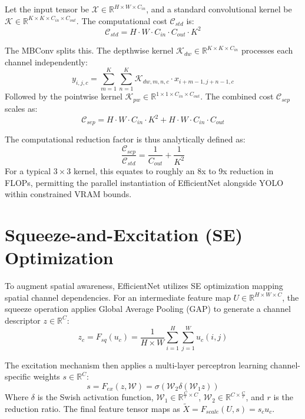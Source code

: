 \documentclass[11pt, letterpaper, oneside, openany]{book}
\begin{document}
Let the input tensor be $\mathcal{X} \in \mathbb{R}^{H \times W \times C_{in}}$, and a standard convolutional kernel be $\mathcal{K} \in \mathbb{R}^{K \times K \times C_{in} \times C_{out}}$. The computational cost $\mathcal{C}_{std}$ is:
\begin{equation}
    \mathcal{C}_{std} = H \cdot W \cdot C_{in} \cdot C_{out} \cdot K^2
\end{equation}

The MBConv splits this. The depthwise kernel $\mathcal{K}_{dw} \in \mathbb{R}^{K \times K \times C_{in}}$ processes each channel independently:
\begin{equation}
    y_{i,j,c} = \sum_{m=1}^{K}\sum_{n=1}^{K} \mathcal{K}_{dw,m,n,c} \cdot x_{i+m-1, j+n-1, c}
\end{equation}
Followed by the pointwise kernel $\mathcal{K}_{pw} \in \mathbb{R}^{1 \times 1 \times C_{in} \times C_{out}}$. The combined cost $\mathcal{C}_{sep}$ scales as:
\begin{equation}
    \mathcal{C}_{sep} = H \cdot W \cdot C_{in} \cdot K^2 + H \cdot W \cdot C_{in} \cdot C_{out}
\end{equation}

The computational reduction factor is thus analytically defined as:
\begin{equation}
    \frac{\mathcal{C}_{sep}}{\mathcal{C}_{std}} = \frac{1}{C_{out}} + \frac{1}{K^2}
\end{equation}
For a typical $3 \times 3$ kernel, this equates to roughly an 8x to 9x reduction in FLOPs, permitting the parallel instantiation of EfficientNet alongside YOLO within constrained VRAM bounds.

\section{Squeeze-and-Excitation (SE) Optimization}
To augment spatial awareness, EfficientNet utilizes SE optimization mapping spatial channel dependencies. For an intermediate feature map $U \in \mathbb{R}^{H \times W \times C}$, the squeeze operation applies Global Average Pooling (GAP) to generate a channel descriptor $z \in \mathbb{R}^C$:
\begin{equation}
    z_c = F_{sq}(u_c) = \frac{1}{H \times W} \sum_{i=1}^{H}\sum_{j=1}^{W} u_c(i,j)
\end{equation}

The excitation mechanism then applies a multi-layer perceptron learning channel-specific weights $s \in \mathbb{R}^C$:
\begin{equation}
    s = F_{ex}(z, \mathcal{W}) = \sigma(\mathcal{W}_2 \delta(\mathcal{W}_1 z))
\end{equation}
Where $\delta$ is the Swish activation function, $\mathcal{W}_1 \in \mathbb{R}^{\frac{C}{r} \times C}$, $\mathcal{W}_2 \in \mathbb{R}^{C \times \frac{C}{r}}$, and $r$ is the reduction ratio. The final feature tensor maps as $\tilde{X} = F_{scale}(U, s) = s_c u_c$.
\end{document}
